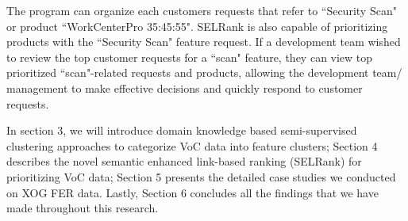 \documentclass[sigconf]{acmart}
\begin{document}
The program can organize each customers requests that refer to ``Security Scan" or product ``WorkCenterPro 35:45:55". SELRank is also capable of prioritizing products with the ``Security Scan" feature request. If a development team wished to review the top customer requests for a ``scan" feature, they can view top prioritized ``scan"-related requests and products, allowing the development team/ management to make effective decisions and quickly respond to customer requests. 

In section 3, we will introduce domain knowledge based semi-supervised clustering approaches to categorize VoC data into feature clusters; Section 4 describes the novel semantic enhanced link-based ranking (SELRank) for prioritizing VoC data; Section 5 presents the detailed case studies we conducted on XOG FER data. Lastly, Section 6 concludes all the findings that we have made throughout this research. 
\end{document}

